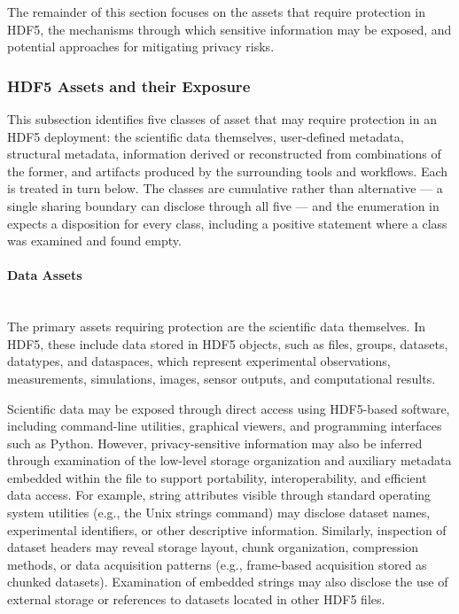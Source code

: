 \documentclass[../main.tex]{subfiles}
\begin{document}
The remainder of this section focuses on the assets that require protection in HDF5, the mechanisms
through which sensitive information may be exposed, and potential approaches for mitigating privacy risks.

\subsubsection{HDF5 Assets and their Exposure}

This subsection identifies five classes of asset that may require protection
in an HDF5 deployment: the scientific data themselves, user-defined metadata,
structural metadata, information derived or reconstructed from combinations of
the former, and artifacts produced by the surrounding tools and workflows.
Each is treated in turn below. The classes are cumulative rather than
alternative --- a single sharing boundary can disclose through all five --- and
the enumeration in  expects a disposition for every class,
including a positive statement where a class was examined and found empty.

\paragraph{Data Assets}\mbox{}\\
The primary assets requiring protection are the scientific data themselves. In HDF5, these 
include data stored in HDF5 objects, such as files, groups, datasets, datatypes, and dataspaces, 
which represent experimental observations, measurements, simulations, images, 
sensor outputs, and computational results.

Scientific data may be exposed through direct access using HDF5-based software, including 
command-line utilities, graphical viewers, and programming interfaces such as Python. 
However, privacy-sensitive information may also be inferred through examination of the low-level 
storage organization and auxiliary metadata embedded within the file to support portability, 
interoperability, and efficient data access. For example, string attributes visible through 
standard operating system utilities (e.g., the Unix strings command) may disclose dataset 
names, experimental identifiers, or other descriptive information. Similarly, inspection 
of dataset headers may reveal storage layout, chunk organization, compression methods, 
or data acquisition patterns (e.g., frame-based acquisition stored as chunked datasets). 
Examination of embedded strings may also disclose the use of external storage or references 
to datasets located in other HDF5 files.
\end{document}
